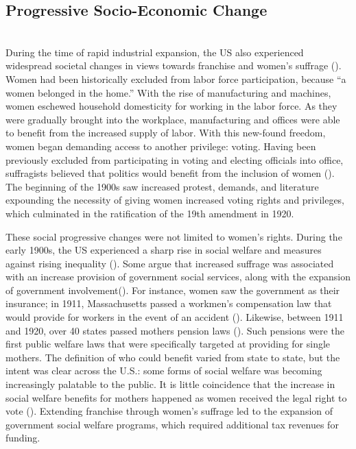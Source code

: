 \documentclass[letter, 12pt]{article}
\begin{document}
\subsection{Progressive Socio-Economic Change}\hfill\\

During the time of rapid industrial expansion, the US also experienced widespread societal changes in views towards franchise and women’s suffrage (\citealt{baker1984domestication}). Women had been historically excluded from labor force participation, because “a women belonged in the home.” With the rise of manufacturing and machines, women eschewed household domesticity for working in the labor force. As they were gradually brought into the workplace, manufacturing and offices were able to benefit from the increased supply of labor. With this new-found freedom, women began demanding access to another privilege: voting. Having been previously excluded from participating in voting and electing officials into office, suffragists believed that politics would benefit from the inclusion of women (\citealt{baker1984domestication}). The beginning of the 1900s saw increased protest, demands, and literature expounding the necessity of giving women increased voting rights and privileges, which culminated in the ratification of the 19th amendment in 1920.

These social progressive changes were not limited to women’s rights. During the early 1900s, the US experienced a sharp rise in social welfare and measures against rising inequality (\citealt{hays1995response}). Some argue that increased suffrage was associated with an increase provision of government social services, along with the expansion of government involvement(\citealt{lott1999did}).  For instance, women saw the government as their insurance; in 1911, Massachusetts passed a workmen’s compensation law that would provide for workers in the event of an accident (\citealt{orloff1984not}).  Likewise, between 1911 and 1920, over 40 states passed mothers pension laws (\citealt{koven2013mothers}). Such pensions were the first public welfare laws that were specifically targeted at providing for single mothers. The definition of who could benefit varied from state to state, but the intent was clear across the U.S.: some forms of social welfare was becoming increasingly palatable to the public. It is little coincidence that the increase in social welfare benefits for mothers happened as women received the legal right to vote (\citealt{bock2012maternity}). Extending franchise through women's suffrage led to the expansion of government social welfare programs, which required additional tax revenues for funding.
\end{document}
